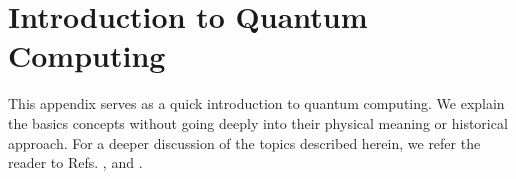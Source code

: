
\chapter{Introduction to Quantum Computing} %
This appendix serves as a quick introduction to quantum computing. We explain the basics concepts without going deeply into their physical meaning or historical approach. For a deeper discussion of the topics described herein, we refer the reader to Refs. \cite{W.Bryon1992HilbertFunctions},  \cite{Scherer2019MathematicsComputing} and \cite{Nielsen2010QuantumInformation}.
\label{AppendixA} %
